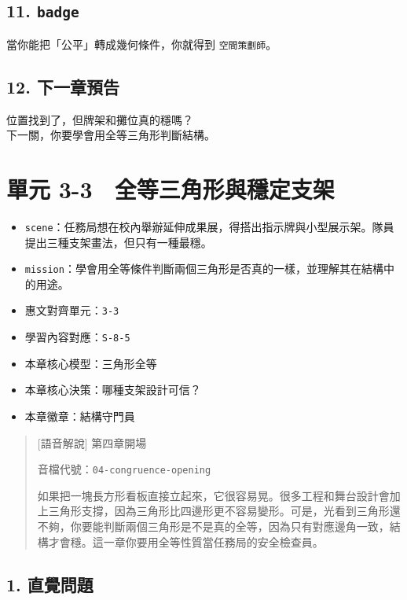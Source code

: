 \documentclass[
  chinese,
  12pt,
  a4paper,
  oneside]{article}
\providecommand{\tightlist}{%
  \setlength{\itemsep}{0pt}\setlength{\parskip}{0pt}}
\begin{document}
\subsection{\texorpdfstring{11.
\texttt{badge}}{11. badge}}\label{badge-2}

當你能把「公平」轉成幾何條件，你就得到 \texttt{空間策劃師}。

\subsection{12. 下一章預告}\label{ux4e0bux4e00ux7ae0ux9810ux544a-2}

位置找到了，但牌架和攤位真的穩嗎？\\
下一關，你要學會用全等三角形判斷結構。

\newpage

\section{單元
3-3　全等三角形與穩定支架}\label{ux55aeux5143-3-3-ux5168ux7b49ux4e09ux89d2ux5f62ux8207ux7a69ux5b9aux652fux67b6}

\begin{itemize}
\tightlist
\item
  \texttt{scene}：任務局想在校內舉辦延伸成果展，得搭出指示牌與小型展示架。隊員提出三種支架畫法，但只有一種最穩。
\item
  \texttt{mission}：學會用全等條件判斷兩個三角形是否真的一樣，並理解其在結構中的用途。
\item
  惠文對齊單元：\texttt{3-3}
\item
  學習內容對應：\texttt{S-8-5}
\item
  本章核心模型：三角形全等
\item
  本章核心決策：哪種支架設計可信？
\item
  本章徽章：結構守門員
\end{itemize}

\begin{quote}
{[}語音解說{]} 第四章開場

音檔代號：\texttt{04-congruence-opening}

如果把一塊長方形看板直接立起來，它很容易晃。很多工程和舞台設計會加上三角形支撐，因為三角形比四邊形更不容易變形。可是，光看到三角形還不夠，你要能判斷兩個三角形是不是真的全等，因為只有對應邊角一致，結構才會穩。這一章你要用全等性質當任務局的安全檢查員。
\end{quote}

\subsection{1. 直覺問題}\label{ux76f4ux89baux554fux984c-5}
\end{document}
